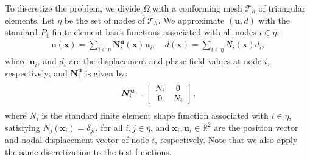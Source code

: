 {To discretize the problem, we divide $\Omega$ with a conforming mesh $\mathscr{T}_h$ of triangular elements. %
Let $\eta$ be the set of nodes of $\mathscr{T}_h$. We approximate $(\bm{u},d)$ with the standard {$P_1$} finite element basis functions associated with all nodes $i \in\eta$:}
\begin{equation}\label{Eq:discretization}
    \begin{aligned}
        \bm{u}(\bm{x})=\sum_{i\in\eta} \bm{N}^{\bm{u}}_{i}(\bm{x}) \mathbf{u}_i,\quad
	    d(\bm{x})=\sum_{i\in\eta}N_i(\bm{x}) d_i,
	\end{aligned}
\end{equation}
{where $\mathbf{u}_i$, and $d_i$ are the displacement and phase field values at node $i$, respectively; and $\bm{N}^{\bm{u}}_{i}$ is given by:}
\begin{equation*}
    \begin{aligned}
        \bm{N}^{\bm{u}}_{i}=\left[
		\begin{array}{c c}
			N_i &  0 \\
			0 & N_i
		\end{array}
		\right],
    \end{aligned}
\end{equation*}
{where $N_i$ is the standard finite element shape function associated with $i\in\eta$, satisfying $N_j(\mathbf{x}_i)=\delta_{ji}$, for all $i,j\in\eta$, and $\mathbf{x}_i,\mathbf{u}_i\in\mathbb{R}^{2}$ are the position vector and nodal displacement vector of node $i$, respectively. %
Note that we also apply the same discretization to the test functions.}

